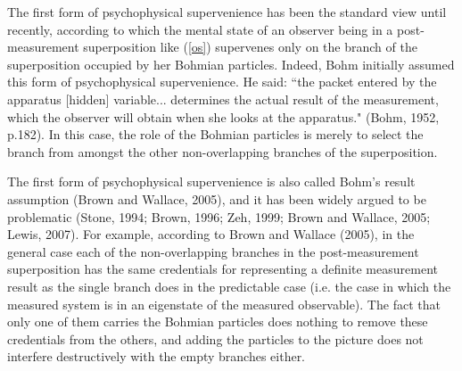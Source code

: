 
The first form of psychophysical supervenience has been the standard view until recently, according to which the mental state of an observer being in a post-measurement superposition like (\ref{os}) supervenes only on the branch of the superposition occupied by her Bohmian particles. 
Indeed, Bohm initially assumed this form of psychophysical supervenience. He said: ``the packet entered by the apparatus [hidden] variable...  determines the actual result of the measurement, which the observer will obtain when she looks at the apparatus." (Bohm, 1952, p.182). 
In this case, the role of the Bohmian particles is merely to select the branch from amongst the other non-overlapping branches of the superposition.

The first form of psychophysical supervenience is also called Bohm's result assumption (Brown and Wallace, 2005), and it has been widely argued to be problematic (Stone, 1994; Brown, 1996; Zeh, 1999; Brown and Wallace, 2005; Lewis, 2007). 
For example, according to Brown and Wallace (2005), in the general case each of the non-overlapping branches in the post-measurement superposition has the same credentials for representing a definite measurement result as the single branch does in the predictable case (i.e. the case in which the measured system is in an eigenstate of the measured observable). The fact that only one of them carries the Bohmian particles does nothing to remove these credentials from the others, and adding the particles to the picture does not interfere destructively with the empty branches either.

